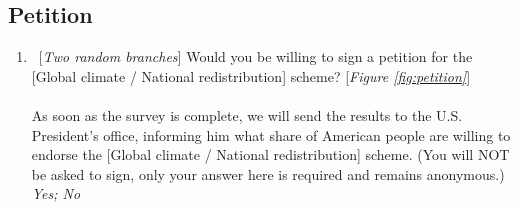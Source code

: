 \subsection*{Petition}
\begin{enumerate}[resume] \item ~[\textit{Two random branches}] \label{q:petition} Would you be willing to sign a petition for the [Global climate / National redistribution] scheme?  [\textit{Figure \ref{fig:petition}}]\\
\\
As soon as the survey is complete, we will send the results to the U.S. President's office, informing him what share of American people are willing to endorse the [Global climate / National redistribution] scheme. (You will NOT be asked to sign, only your answer here is required and remains anonymous.) 
\textit{Yes; No}
\end{enumerate}

